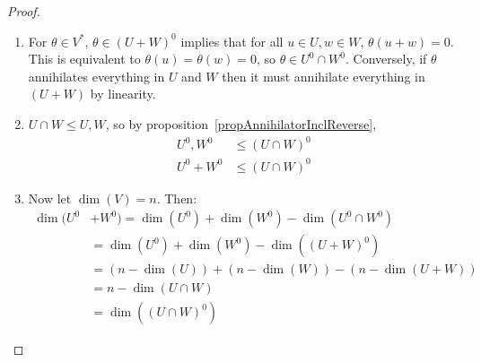\documentclass[../Main.tex]{subfiles}
\begin{document}
\begin{proof}
    \begin{enumerate}
        \item For $\theta \in V^*$, $\theta \in (U + W)^0$ implies that for all $u \in U, w \in W$, $\theta(u + w) = 0$. This is equivalent to $\theta(u) = \theta(w) = 0$, so $\theta \in U^0 \cap W^0$. Conversely, if $\theta$ annihilates everything in $U$ and $W$ then it must annihilate everything in $(U + W)$ by linearity.
        \item $U \cap W \leq U, W$, so by proposition~\ref{propAnnihilatorInclReverse},
            \begin{align*}
                U^0, W^0 & \leq (U\cap W)^0 \\
                U^0 + W^0 &\leq (U \cap W)^0
            \end{align*}
        \item Now let $\dim(V) = n$. Then:
            \begin{align*}
                \dim(U^0 &+ W^0) = \dim(U^0) + \dim(W^0) - \dim(U^0 \cap W^0) \\
                &= \dim(U^0) + \dim(W^0) - \dim((U + W)^0) \\
                &= (n- \dim(U)) + (n - \dim(W)) - (n - \dim(U + W)) \\
                &= n - \dim(U \cap W) \\
                &= \dim((U \cap W)^0)
            \end{align*}
    \end{enumerate}
\end{proof}
\end{document}

